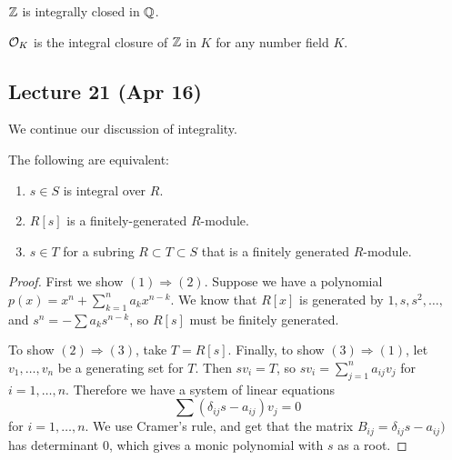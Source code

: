 \documentclass[10pt, twoside]{article}
\begin{document}
        \begin{exm} $\mathbb{Z}$ is integrally closed in $\mathbb{Q}$.  \end{exm}

        \begin{exm} $\mathcal{O}_K$ is the integral closure of $\mathbb{Z}$ in $K$ for any
        number field $K$.  \end{exm}
        
        \subsection{Lecture 21 (Apr 16)} We continue our discussion of
        integrality.

        \begin{prop} The following are equivalent: \begin{enumerate} \item $s
            \in S$ is integral over $R$.  \item $R[s]$ is a finitely-generated
            $R$-module.  \item $s \in T$ for a subring $R \subset T \subset S$
            that is a finitely generated $R$-module.  \end{enumerate}
            \begin{proof} First we show $(1) \Rightarrow (2)$. Suppose we have
                a polynomial $p(x) = x^n + \sum_{k=1}^n a_kx^{n-k}$. We know
                that $R[x]$ is generated by $1,s,s^2, \ldots,$ and $s^n = -
                \sum a_k s^{n-k}$, so $R[s]$ must be finitely generated.

                To show $(2) \Rightarrow (3)$, take $T = R[s]$. Finally, to
                show $(3) \Rightarrow (1)$, let $v_1, \ldots, v_n$ be a
                generating set for $T$. Then $sv_i = T$, so $sv_i =
                \sum_{j=1}^n a_{ij}v_j$ for $i = 1, \ldots, n$. Therefore we
                have a system of linear equations \[\sum (\delta_{ij}s -
                a_{ij}) v_j = 0 \] for $i = 1, \ldots, n$. We use Cramer's
            rule, and get that the matrix $B_{ij} = \delta_{ij}s - a_{ij})$ has
        determinant $0$, which gives a monic polynomial with $s$ as a root.
    \end{proof} \end{prop}
\end{document}
